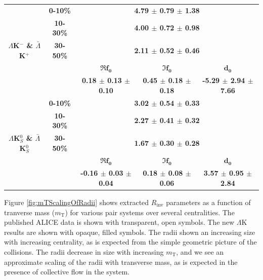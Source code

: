 \documentclass[../AnalysisNoteJBuxton.tex]{subfiles}
\begin{document}
\begin{landscape}
\begin{table}[htbp]
{\begin{tabular}{|c|c|c|c|c|}
  \hline
  \hline
  
  \multirow{5}{*}{\large \textbf{$\Lambda$K$^{-}$ \& $\bar{\Lambda}$K$^{+}$}} 
  &  \textbf{0-10\%} & \multicolumn{3}{c|}{\textbf{4.79 $\pm$ 0.79 $\pm$ 1.38}} \\  %
  & \textbf{10-30\%} & \multicolumn{3}{c|}{\textbf{4.00 $\pm$ 0.72 $\pm$ 0.98}} \\  %
  & \textbf{30-50\%} & \multicolumn{3}{c|}{\textbf{2.11 $\pm$ 0.52 $\pm$ 0.46}} \\  %
  \cline{2-5}
  & & \large $\mathbf{\Re f_{0}}$ & \large $\mathbf{\Im f_{0}}$ & \large $\mathbf{d_{0}}$ \\
  \cline{3-5}     
  & & \textbf{0.18 $\pm$ 0.13 $\pm$ 0.10} & \textbf{0.45 $\pm$ 0.18 $\pm$ 0.18} & \textbf{-5.29 $\pm$ 2.94 $\pm$ 7.66} \\
   
  \hline
  \hline  
  
  \multirow{5}{*}{\large \textbf{$\Lambda$K$^{0}_{S}$ \& $\bar{\Lambda}$K$^{0}_{S}$}}  
   &  \textbf{0-10\%} & \multicolumn{3}{c|}{\textbf{3.02 $\pm$ 0.54 $\pm$ 0.33}} \\  %
   & \textbf{10-30\%} & \multicolumn{3}{c|}{\textbf{2.27 $\pm$ 0.41 $\pm$ 0.32}} \\  %
   & \textbf{30-50\%} & \multicolumn{3}{c|}{\textbf{1.67 $\pm$ 0.30 $\pm$ 0.28}} \\  %
   \cline{2-5}   
   & & \large $\mathbf{\Re f_{0}}$ & \large $\mathbf{\Im f_{0}}$ & \large $\mathbf{d_{0}}$ \\
   \cline{3-5} 
   & & \textbf{-0.16 $\pm$ 0.03 $\pm$ 0.04} & \textbf{0.18 $\pm$ 0.08 $\pm$ 0.06} & \textbf{3.57 $\pm$ 0.95 $\pm$ 2.84} \\
  \hline
 \end{tabular}}
 \label{tab:FitResultsLamKchandLamK0QM2}
\end{table}

\end{landscape}
\pagestyle{plain}

Figure \ref{fig:mTScalingOfRadii} shows extracted $R_{\mathrm{inv}}$ parameters as a function of tranverse mass ($m_{\mathrm{T}}$) for various pair systems over several centralities.  The published ALICE data \cite{Adam:2015vja} is shown with transparent, open symbols.  The new $\Lambda$K results are shown with opaque, filled symbols.  The radii shown an increasing size with increasing centrality, as is expected from the simple geometric picture of the collisions.  The radii decrease in size with increasing $m_{\mathrm{T}}$, and we see an approximate scaling of the radii with transverse mass, as is expected in the presence of collective flow in the system.
\end{document}
